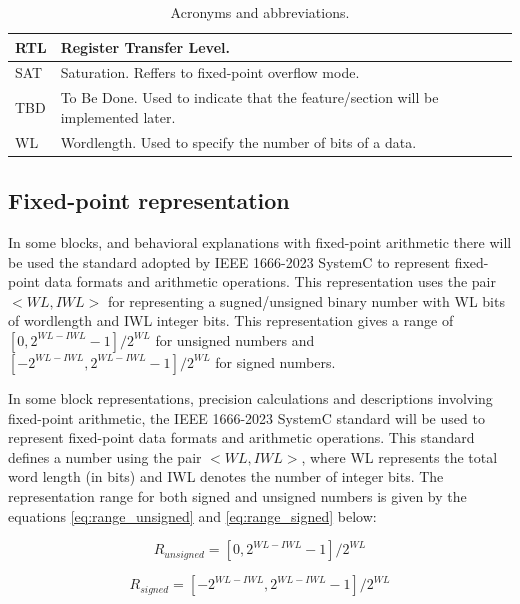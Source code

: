 \begin{table}[h]
\begin{tabular}{|>{\centering\arraybackslash}p{1.5cm}|
                     >{\raggedright\arraybackslash}p{6.5cm}|}
        RTL   & Register Transfer Level.                                                                   \\ \hline
        SAT   & Saturation. Reffers to fixed-point overflow mode.                                          \\ \hline
        TBD   & To Be Done. Used to indicate that the feature/section will be implemented later.           \\ \hline
        WL    & Wordlength. Used to specify the number of bits of a data.                                  \\ \hline
	\end{tabular}
    \caption{Acronyms and abbreviations.}
    \label{tab:glossary}
\end{table}

\subsection{Fixed-point representation}
\label{sec:fixed_point_representation}

In some blocks, and behavioral explanations with fixed-point arithmetic there will be used the standard adopted by IEEE 1666-2023 SystemC to represent fixed-point data formats and arithmetic operations. This representation uses the pair $<WL, IWL>$ for representing a sugned/unsigned binary number with WL bits of wordlength and IWL integer bits. This representation gives a range of $\left[0, 2^{WL-IWL}-1 \right] / 2^{WL}$ for unsigned numbers and $\left[-2^{WL-IWL}, 2^{WL-IWL}-1 \right] / 2^{WL}$ for signed numbers. 

In some block representations, precision calculations and descriptions involving fixed-point arithmetic, the IEEE 1666-2023 SystemC standard will be used to represent fixed-point data formats and arithmetic operations. This standard defines a number using the pair $<WL, IWL>$, where WL represents the total word length (in bits) and IWL denotes the number of integer bits. The representation range for both signed and unsigned numbers is given by the equations \eqref{eq:range_unsigned} and \eqref{eq:range_signed} below:


\begin{equation}
    R_{unsigned} = \left[0, 2^{WL-IWL}-1 \right] / 2^{WL}
    \label{eq:range_unsigned}
\end{equation}

\begin{equation}
    R_{signed} = \left[-2^{WL-IWL},2^{WL-IWL}-1 \right] / 2^{WL}
    \label{eq:range_signed}
\end{equation}

